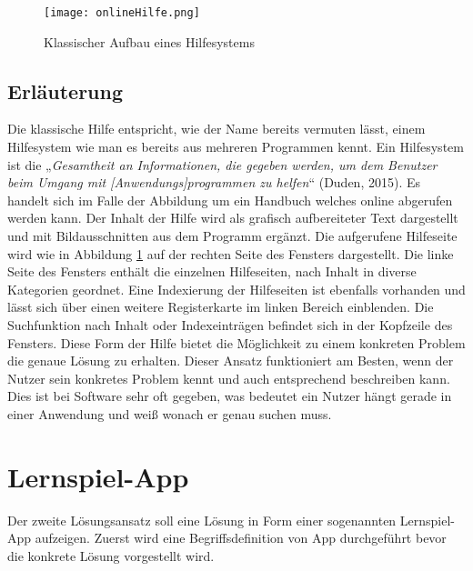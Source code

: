 \begin{figure}[ht]
\begin{center}
\texttt{[image: onlineHilfe.png]}
\caption{Klassischer Aufbau eines Hilfesystems}
\label{img1:helpSystem}
\end{center}
\end{figure} 
\subsection{Erläuterung}
Die klassische Hilfe entspricht, wie der Name bereits vermuten lässt, einem Hilfesystem wie man es bereits aus mehreren Programmen kennt. Ein Hilfesystem ist die „\textit{Gesamtheit an Informationen, die gegeben werden, um dem Benutzer beim Umgang mit [Anwendungs]programmen zu helfen}“ (Duden, 2015). Es handelt sich im Falle der Abbildung um ein Handbuch welches online abgerufen werden kann. Der Inhalt der Hilfe wird als grafisch aufbereiteter Text dargestellt und mit Bildausschnitten aus dem Programm ergänzt. Die aufgerufene Hilfeseite wird wie in Abbildung \ref{img1:helpSystem} auf der rechten Seite des Fensters dargestellt. Die linke Seite des Fensters enthält die einzelnen Hilfeseiten, nach Inhalt in diverse Kategorien geordnet. Eine Indexierung der Hilfeseiten ist ebenfalls vorhanden und lässt sich über einen weitere Registerkarte im linken Bereich einblenden. Die Suchfunktion nach Inhalt oder Indexeinträgen befindet sich in der Kopfzeile des Fensters. Diese Form der Hilfe bietet die Möglichkeit zu einem konkreten Problem die genaue Lösung zu erhalten. Dieser Ansatz funktioniert am Besten, wenn der Nutzer sein konkretes Problem kennt und auch entsprechend beschreiben kann. Dies ist bei Software sehr oft gegeben, was bedeutet ein Nutzer hängt gerade in einer Anwendung und weiß wonach er genau suchen muss.

\section{Lernspiel-App}
Der zweite Lösungsansatz soll eine Lösung in Form einer sogenannten Lernspiel-App aufzeigen. Zuerst wird eine Begriffsdefinition von App durchgeführt bevor die konkrete Lösung vorgestellt wird.

